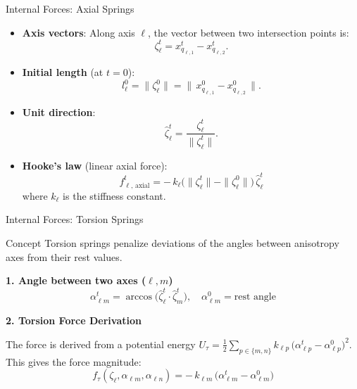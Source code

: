 \documentclass{beamer}
\begin{document}
\begin{frame}[fragile]{Internal Forces: Axial Springs}
    \begin{itemize}
        \item \textbf{Axis vectors}: Along axis $\ell$, the vector between two intersection points is:
        \[
        \zeta_\ell^t = x^t_{q_{\ell,1}} - x^t_{q_{\ell,2}}.
        \]
        
        \item \textbf{Initial length} (at $t=0$):
        \[
        l^0_\ell = \|\zeta_\ell^0\| = \bigl\|\,x^0_{q_{\ell,1}}-x^0_{q_{\ell,2}}\,\bigr\|.
        \]
        
        \item \textbf{Unit direction}:
        \[
        \hat\zeta_\ell^t = \frac{\zeta_\ell^t}{\|\zeta_\ell^t\|}.
        \]
        
        \item \textbf{Hooke’s law} (linear axial force):
        \begin{equation*}
        \boxed{
        f^{t}_{\ell,\,\mathrm{axial}} = -\,k_\ell\bigl(\|\zeta_\ell^t\| - \|\zeta_\ell^0\|\bigr)\,\hat\zeta_\ell^t
        }
        \end{equation*}
        where $k_\ell$ is the stiffness constant.
    \end{itemize}
\end{frame}

\begin{frame}[fragile]{Internal Forces: Torsion Springs}
    \begin{block}{Concept}
    Torsion springs penalize deviations of the angles between anisotropy axes from their rest values.
    \end{block}
    
    \textbf{1. Angle between two axes ($\ell, m$)}
    \[
        \alpha^t_{\ell m} = \arccos\bigl(\hat\zeta_\ell^t \!\cdot\! \hat\zeta_m^t\bigr), \quad \alpha^0_{\ell m} = \text{rest angle}
    \]
    
    \textbf{2. Torsion Force Derivation}
    
    The force is derived from a potential energy $U_\tau = \tfrac12\sum_{p\in\{m,n\}} k_{\ell p}\,\bigl(\alpha^t_{\ell p}-\alpha^0_{\ell p}\bigr)^2$. This gives the force magnitude:
    \[
        f_\tau(\zeta_\ell,\alpha_{\ell m},\alpha_{\ell n}) = -\,k_{\ell m}\,\bigl(\alpha^t_{\ell m}-\alpha^0_{\ell m}\bigr)
    \]
\end{frame}
\end{document}
